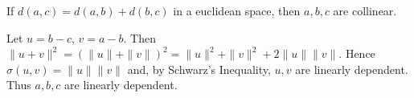 If $d(a, c) = d(a, b) + d(b, c)$ in a euclidean space, then $a, b, c$ are collinear.

Let $u = b - c$, $v = a - b$. Then $\|u + v\|^2 = (\|u\| + \|v\|)^2 = \|u\|^2 + \|v\|^2 + 2\|u\|\|v\|$. Hence $\sigma(u, v) = \|u\| \|v\|$ and, by Schwarz's Inequality, $u, v$ are linearly dependent. Thus $a, b, c$ are linearly dependent.
